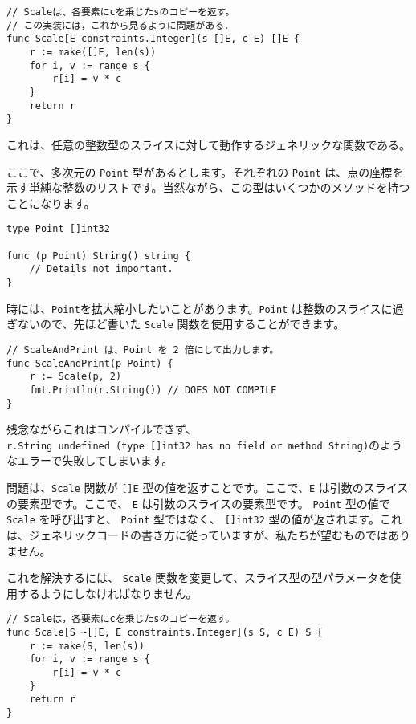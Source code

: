 \begin{lstlisting}[numbers=none]
// Scaleは、各要素にcを乗じたsのコピーを返す。
// この実装には，これから見るように問題がある．
func Scale[E constraints.Integer](s []E, c E) []E {
    r := make([]E, len(s))
    for i, v := range s {
        r[i] = v * c
    }
    return r
}
\end{lstlisting}

これは、任意の整数型のスライスに対して動作するジェネリックな関数である。

ここで、多次元の \texttt{Point} 型があるとします。それぞれの
\texttt{Point}
は、点の座標を示す単純な整数のリストです。当然ながら、この型はいくつかのメソッドを持つことになります。

\begin{lstlisting}[numbers=none]
type Point []int32

func (p Point) String() string {
    // Details not important.
}
\end{lstlisting}

時には、\texttt{Point}を拡大縮小したいことがあります。\texttt{Point}
は整数のスライスに過ぎないので、先ほど書いた \texttt{Scale}
関数を使用することができます。

\begin{lstlisting}[numbers=none]
// ScaleAndPrint は、Point を 2 倍にして出力します。
func ScaleAndPrint(p Point) {
    r := Scale(p, 2)
    fmt.Println(r.String()) // DOES NOT COMPILE
}
\end{lstlisting}

残念ながらこれはコンパイルできず、\texttt{r.String\ undefined\ (type\ {[}{]}int32\ has\ no\ field\ or\ method\ String)}のようなエラーで失敗してしまいます。

問題は、\texttt{Scale} 関数が \texttt{{[}{]}E}
型の値を返すことです。ここで、\texttt{E}
は引数のスライスの要素型です。ここで、 \texttt{E}
は引数のスライスの要素型です。 \texttt{Point} 型の値で \texttt{Scale}
を呼び出すと、 \texttt{Point} 型ではなく、 \texttt{{[}{]}int32}
型の値が返されます。これは、ジェネリックコードの書き方に従っていますが、私たちが望むものではありません。

これを解決するには、 \texttt{Scale}
関数を変更して、スライス型の型パラメータを使用するようにしなければなりません。

\begin{lstlisting}[numbers=none]
// Scaleは，各要素にcを乗じたsのコピーを返す。
func Scale[S ~[]E, E constraints.Integer](s S, c E) S {
    r := make(S, len(s))
    for i, v := range s {
        r[i] = v * c
    }
    return r
}
\end{lstlisting}

